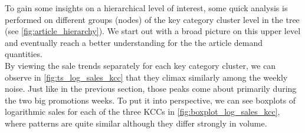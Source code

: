 

To gain some insights on a hierarchical level of interest, some quick analysis is performed on different groups (nodes) of the key category cluster level in the tree (see \autoref{fig:article_hierarchy}). We start out with a broad picture on this upper level 
and eventually reach a better understanding for the the article demand quantities.
\\



By viewing the sale trends separately for each key category cluster, we can observe in \autoref{fig:ts_log_sales_kcc} that they climax similarly among the weekly noise. Just like in the previous section, those peaks come about primarily during the two big promotions weeks. To put it into perspective, we can see boxplots of logarithmic sales for each of the three \acp{KCC} in \autoref{fig:boxplot_log_sales_kcc}, where patterns are quite similar although they differ strongly in volume. 
\\

